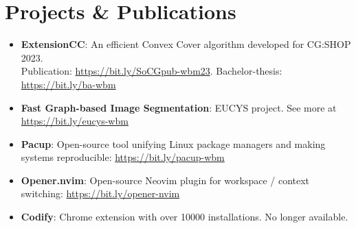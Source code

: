 \documentclass[11pt]{article}
\newcommand{\resumeItem}[2]{
  \item\small{
    \textbf{#1}{: #2 \vspace{-2pt}}
  }
}
\newcommand{\resumeSubItem}[2]{\resumeItem{#1}{#2}\vspace{-4pt}}
\newcommand{\resumeSubHeadingListStart}{\begin{itemize}[leftmargin=*]}
\newcommand{\resumeSubHeadingListEnd}{\end{itemize}}
\begin{document}
{\section{Projects \& Publications}
  \resumeSubHeadingListStart
    \resumeSubItem{ExtensionCC}
      {\footnotesize{An efficient Convex Cover algorithm developed for CG:SHOP 2023. \\Publication: \href{https://bit.ly/SoCGpub-wbm23}{https://bit.ly/SoCGpub-wbm23}. Bachelor-thesis: \href{https://bit.ly/ba-wbm}{https://bit.ly/ba-wbm}}}
    \resumeSubItem{Fast Graph-based Image Segmentation}{\footnotesize{EUCYS project. See more at \href{https://bit.ly/eucys-wbm}{https://bit.ly/eucys-wbm}}}
    \resumeSubItem{Pacup}{\footnotesize{Open-source tool unifying Linux package managers and making systems reproducible: \href{https://bit.ly/pacup-wbm}{https://bit.ly/pacup-wbm}}}
    \resumeSubItem{Opener.nvim}{\footnotesize{Open-source Neovim plugin for workspace / context switching: \href{https://bit.ly/opener-nvim}{https://bit.ly/opener-nvim}}}
    \resumeSubItem{Codify}{\footnotesize{Chrome extension with over 10000 installations. No longer available.}}
  \resumeSubHeadingListEnd
  }
\end{document}
